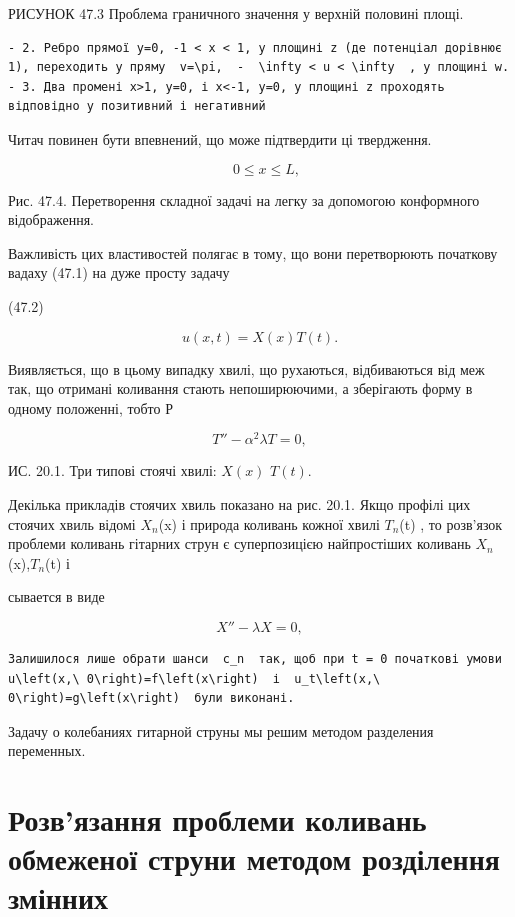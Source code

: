 \documentclass[
  ukrainian,
]{article}
\begin{document}
РИСУНОК 47.3 Проблема граничного значення у верхній половині площі.

\begin{verbatim}
- 2. Ребро прямої y=0, -1 < x < 1, у площині z (де потенціал дорівнює 1), переходить у пряму  v=\pi,  -  \infty < u < \infty  , у площині w. - 3. Два промені x>1, y=0, і x<-1, y=0, у площині z проходять відповідно у позитивний і негативний
\end{verbatim}

Читач повинен бути впевнений, що може підтвердити ці твердження.

\[
\quad 0 \le x \le L,
\]

Рис. 47.4. Перетворення складної задачі на легку за допомогою
конформного відображення.

Важливість цих властивостей полягає в тому, що вони перетворюють
початкову вадаху (47.1) на дуже просту задачу

(47.2)

\[
u(x, t) = X(x) T(t).
\]

Виявляється, що в цьому випадку хвилі, що рухаються, відбиваються від
меж так, що отримані коливання стають непоширюючими, а зберігають форму
в одному положенні, тобто Р

\[
T'' - \alpha^2 \lambda T = 0,
\]

ИС. 20.1. Три типові стоячі хвилі: \(X(x)\) \(T(t)\).

Декілька прикладів стоячих хвиль показано на рис. 20.1. Якщо профілі цих
стоячих хвиль відомі \(X_n\)(x) і природа коливань кожної хвилі
\(T_n\)(t) , то розв'язок проблеми коливань гітарних струн є
суперпозицією найпростіших коливань \(X_n\)(x),\(T_n\)(t) і

сывается в виде

\[
X'' - \lambda X = 0,
\]

\begin{verbatim}
Залишилося лише обрати шанси  c_n  так, щоб при t = 0 початкові умови  u\left(x,\ 0\right)=f\left(x\right)  і  u_t\left(x,\ 0\right)=g\left(x\right)  були виконані.
\end{verbatim}

Задачу о колебаниях гитарной струны мы решим методом разделения
переменных.

\section{Розв'язання проблеми коливань обмеженої струни методом
розділення
змінних}\label{ux440ux43eux437ux432ux44fux437ux430ux43dux43dux44f-ux43fux440ux43eux431ux43bux435ux43cux438-ux43aux43eux43bux438ux432ux430ux43dux44c-ux43eux431ux43cux435ux436ux435ux43dux43eux457-ux441ux442ux440ux443ux43dux438-ux43cux435ux442ux43eux434ux43eux43c-ux440ux43eux437ux434ux456ux43bux435ux43dux43dux44f-ux437ux43cux456ux43dux43dux438ux445}
\end{document}
